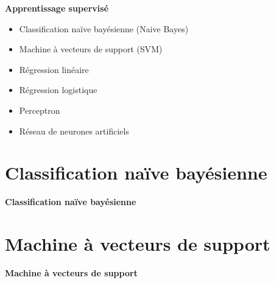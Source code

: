 \documentclass[]{beamer} %
\begin{document}
\begin{frame}

\begin{center}
	\Huge\bfseries Apprentissage supervisé
\end{center}

\begin{itemize}
	\item Classification naïve bayésienne (Naive Bayes)
	\item Machine à vecteurs de support (SVM)
	\item Régression linéaire
	\item Régression logistique
	\item Perceptron
	\item Réseau de neurones artificiels
\end{itemize}

\end{frame}

\section{Classification naïve bayésienne}

\begin{frame}

\begin{center}
	\Huge\bfseries Classification naïve bayésienne
\end{center}

\end{frame}


\section{Machine à vecteurs de support}

\begin{frame}

\begin{center}
	\Huge\bfseries Machine à vecteurs de support
\end{center}

\end{frame}
\end{document}
